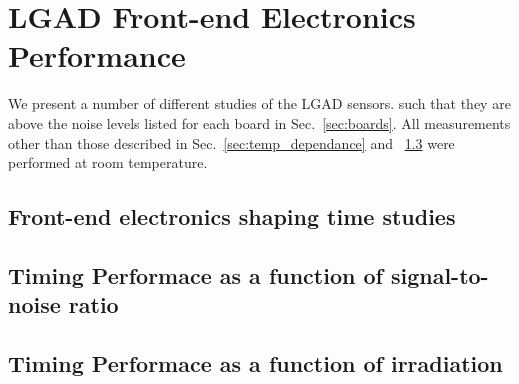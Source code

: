 \documentclass[preprint,1p]{elsarticle}
\begin{document}
\section{LGAD Front-end Electronics Performance}
\label{sec:results}

We present a number of different studies of the LGAD sensors.
such that they are above the noise levels listed for each board in
Sec.~\ref{sec:boards}. All measurements other than those described in
Sec.~\ref{sec:temp_dependance} and ~\ref{sec:rad_tolerance} were performed at
room temperature.
\subsection{Front-end electronics shaping time studies}
\label{sec:shaping_time}
\subsection{Timing Performace as a function of signal-to-noise ratio}
\label{sec:snr}
\subsection{Timing Performace as a function of irradiation}
\label{sec:rad_tolerance}





\end{document}
